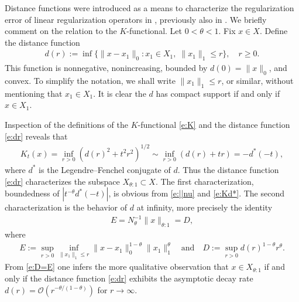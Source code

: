 \documentclass[10pt, a4paper]{iopart}
\newcommand{\norm}[2]{     \| #1       \|_{ #2 }}
\theoremstyle{remark}
\theoremstyle{definition}
\newcommand{\TODO}[1]{\textrm{\color{red}TODO: #1}}
\begin{document}
Distance functions were introduced
as a means
to characterize the regularization error of linear regularization operators
in \cite{FlemmingHofmannMathe2011},
previously also in \cite[Theorem 2.12]{BakushinskyKokurin2004}.
%
We briefly comment on the relation to the $K$-functional.
%
Let $0 < \theta < 1$.
%
Fix $x \in X$.
%
Define
the distance function
\begin{align}
\label{e:dr} 
	d(r) 
	:=
	\inf
	\{ \norm{ x - x_1 }{0} : x_1 \in X_1, \; \norm{x_1}{1} \leq r \}
	,
	\quad
	r \geq 0
	.
\end{align}
%
This function is nonnegative,
nonincreasing,
bounded by $d(0) = \norm{x}{0}$,
and convex.
%
%
%
%
To simplify the notation,
we shall write $\norm{x_1}{1} \leq r$, or similar,
without mentioning that $x_1 \in X_1$.
%
It is clear the $d$ has compact support
if and only if $x \in X_1$.

Inspection of the definitions 
of the $K$-functional \eqref{e:K} and the distance function \eqref{e:dr}
reveals
that
\begin{align}
\label{e:Kd*}
	K_t(x) = \inf_{r > 0} (d(r)^2 + t^2 r^2)^{1/2}
	\sim
	\inf_{r > 0} (d(r) + t r)
	=
	-d^*(-t)
	,
\end{align}
where $d^*$ is the Legendre--Fenchel conjugate of $d$.
%
Thus the distance function \eqref{e:dr} 
characterizes the subspace $X_{\theta:1} \subset X$.
%
The first characterization,
boundedness
of $|t^{-\theta} d^*(-t)|$,
is obvious from \eqref{e:||nu} and \eqref{e:Kd*}.
%
The second characterization
is the behavior of $d$ at infinity,
more precisely the identity
\begin{align}
\label{e:D=E}
	E %
	=
	N_{\theta}^{-1}
	\norm{x}{\theta:1}
	=
	D %
	,
\end{align}
where
\begin{align}
\label{e:ED}
 	E%
	:=
	\sup_{r > 0}
	\inf_{ \norm{x_1}{1} \leq r }
	\norm{ x - x_1 }{0}^{1-\theta} 
	\norm{x_1}{1}^\theta
	\quad\text{and}\quad
 	D%
	:=
	\sup_{r > 0}
	d(r)^{1 - \theta} 
	r^\theta
	.
\end{align}
%
%
%
From \eqref{e:D=E} one infers
the more qualitative observation
that
$x \in X_{\theta:1}$
if and only if
the distance function \eqref{e:dr} exhibits
the asymptotic decay rate
$d(r) = \mathcal{O}(r^{-\theta / (1-\theta)})$ for $r \to \infty$.
%
\end{document}
